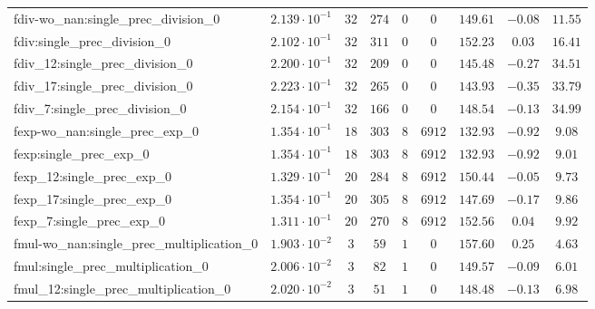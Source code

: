 \begin{tabular}{|l|c|c|c|c|c|c|c|c|}
fdiv-wo\_nan:single\_prec\_division\_0         & $ 2.139 \cdot 10^{-1} $ & $ 32     $ & $ 274    $ & $ 0   $ & $ 0      $ & $ 149.61      $ & $ -0.08   $ & $ 11.55   $ \\
fdiv:single\_prec\_division\_0                 & $ 2.102 \cdot 10^{-1} $ & $ 32     $ & $ 311    $ & $ 0   $ & $ 0      $ & $ 152.23      $ & $ 0.03    $ & $ 16.41   $ \\
fdiv\_12:single\_prec\_division\_0             & $ 2.200 \cdot 10^{-1} $ & $ 32     $ & $ 209    $ & $ 0   $ & $ 0      $ & $ 145.48      $ & $ -0.27   $ & $ 34.51   $ \\
fdiv\_17:single\_prec\_division\_0             & $ 2.223 \cdot 10^{-1} $ & $ 32     $ & $ 265    $ & $ 0   $ & $ 0      $ & $ 143.93      $ & $ -0.35   $ & $ 33.79   $ \\
fdiv\_7:single\_prec\_division\_0              & $ 2.154 \cdot 10^{-1} $ & $ 32     $ & $ 166    $ & $ 0   $ & $ 0      $ & $ 148.54      $ & $ -0.13   $ & $ 34.99   $ \\
fexp-wo\_nan:single\_prec\_exp\_0              & $ 1.354 \cdot 10^{-1} $ & $ 18     $ & $ 303    $ & $ 8   $ & $ 6912   $ & $ 132.93      $ & $ -0.92   $ & $ 9.08    $ \\
fexp:single\_prec\_exp\_0                      & $ 1.354 \cdot 10^{-1} $ & $ 18     $ & $ 303    $ & $ 8   $ & $ 6912   $ & $ 132.93      $ & $ -0.92   $ & $ 9.01    $ \\
fexp\_12:single\_prec\_exp\_0                  & $ 1.329 \cdot 10^{-1} $ & $ 20     $ & $ 284    $ & $ 8   $ & $ 6912   $ & $ 150.44      $ & $ -0.05   $ & $ 9.73    $ \\
fexp\_17:single\_prec\_exp\_0                  & $ 1.354 \cdot 10^{-1} $ & $ 20     $ & $ 305    $ & $ 8   $ & $ 6912   $ & $ 147.69      $ & $ -0.17   $ & $ 9.86    $ \\
fexp\_7:single\_prec\_exp\_0                   & $ 1.311 \cdot 10^{-1} $ & $ 20     $ & $ 270    $ & $ 8   $ & $ 6912   $ & $ 152.56      $ & $ 0.04    $ & $ 9.92    $ \\
fmul-wo\_nan:single\_prec\_multiplication\_0   & $ 1.903 \cdot 10^{-2} $ & $ 3      $ & $ 59     $ & $ 1   $ & $ 0      $ & $ 157.60      $ & $ 0.25    $ & $ 4.63    $ \\
fmul:single\_prec\_multiplication\_0           & $ 2.006 \cdot 10^{-2} $ & $ 3      $ & $ 82     $ & $ 1   $ & $ 0      $ & $ 149.57      $ & $ -0.09   $ & $ 6.01    $ \\
fmul\_12:single\_prec\_multiplication\_0       & $ 2.020 \cdot 10^{-2} $ & $ 3      $ & $ 51     $ & $ 1   $ & $ 0      $ & $ 148.48      $ & $ -0.13   $ & $ 6.98    $ \\

\end{tabular}
